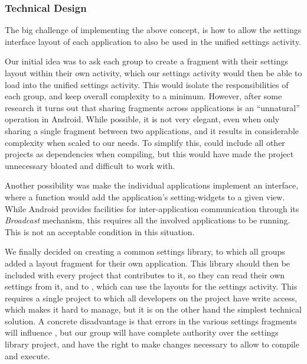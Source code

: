 \subsubsection{Technical Design}
The big challenge of implementing the above concept, is how to allow the settings interface layout of each application to also be used in the unified settings activity. 

Our initial idea was to ask each group to create a fragment with their settings layout within their own activity, which our settings activity would then be able to load into the unified settings activity. This would isolate the responsibilities of each group, and keep overall complexity to a minimum. However, after some research it turns out that sharing fragments across applications is an ``unnatural'' operation in Android. While possible, it is not very elegant, even when only sharing a single fragment between two applications, and it results in considerable complexity when scaled to our needs. To simplify this, \launcher could include all other projects as dependencies when compiling, but this would have made the \launcher project unnecessary bloated and difficult to work with.

Another possibility was make the individual applications implement an interface, where a function would add the application's setting-widgets to a given view. While Android provides facilities for inter-application communication through its \textit{Broadcast} mechanism, this requires all the involved applications to be running. This is not an acceptable condition in this situation. 

We finally decided on creating a common settings library, to which all groups added a layout fragment for their own application. This library should then be included with every project that contributes to it, so they can read their own settings from it, and to \launcher, which can use the layouts for the settings activity. This requires a single project to which all developers on the \giraf project have write access, which makes it hard to manage, but it is on the other hand the simplest technical solution. A concrete disadvantage is that errors in the various settings fragments will influence \launcher, but our group will have complete authority over the settings library project, and have the right to make changes necessary to allow \launcher to compile and execute. 
